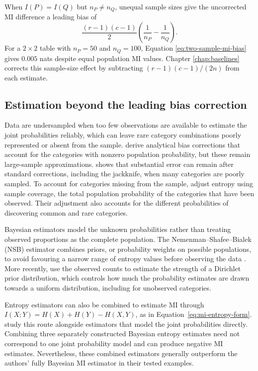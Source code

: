 When \(I(P)=I(Q)\) but \(n_P\ne n_Q\), unequal sample sizes give
the uncorrected MI difference a leading bias of
\begin{equation}
  \frac{(r-1)(c-1)}{2}
  \left(\frac{1}{n_P}-\frac{1}{n_Q}\right).
  \label{eq:two-sample-mi-bias}
\end{equation}
For a \(2\times2\) table with \(n_P=50\) and \(n_Q=100\), Equation
\eqref{eq:two-sample-mi-bias} gives \(0.005\) nats despite equal population MI values. Chapter
\ref{chap:baselines} corrects this sample-size effect by subtracting
\((r-1)(c-1)/(2n)\) from each estimate.

\subsection{Estimation beyond the leading bias correction}

Data are undersampled when too few observations are available to estimate
the joint probabilities reliably, which can leave rare category combinations
poorly represented or absent from the sample. \citet{panzeri1996} derive
analytical bias corrections that account
for the categories with nonzero population probability, but these remain
large-sample approximations. \citet{paninski2003} shows that substantial
error can remain after standard corrections, including the jackknife,
when many categories are poorly sampled. To account for categories missing
from the sample, \citet{chaoshen2003} adjust entropy using sample coverage,
the total population probability of the categories that have been observed.
Their adjustment also accounts for the different probabilities of
discovering common and rare categories.

Bayesian estimators model the unknown probabilities rather than treating
observed proportions as the complete population.
The Nemenman--Shafee--Bialek (NSB) estimator combines priors, or probability
weights on possible populations, to avoid favouring a narrow range of
entropy values before observing the data \citep{nemenman2002}.
More recently, \citet{piga2024} use the observed counts to estimate the
strength of a Dirichlet prior distribution, which controls how much the
probability estimates are drawn towards a uniform distribution, including for
unobserved categories.

Entropy estimators can also be combined to estimate MI through
\(I(X;Y)=H(X)+H(Y)-H(X,Y)\), as in
Equation~\eqref{eq:mi-entropy-form}. \citet{archer2013} study this route
alongside estimators that model the joint probabilities directly. Combining
three separately constructed Bayesian entropy estimates need not correspond
to one joint probability model and can produce negative MI estimates.
Nevertheless, these combined estimators generally outperform the authors'
fully Bayesian MI estimator in their tested examples.


